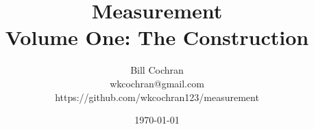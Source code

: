 \documentclass[12pt,oneside]{book}
\begin{document}
\title{Measurement\\[0.4em]\large Volume One: The Construction}
\author{Bill Cochran\\wkcochran@gmail.com\\https://github.com/wkcochran123/measurement}
\date{\today}
\maketitle

\frontmatter
\onehalfspacing
\tableofcontents



\mainmatter

















\backmatter
\printbibliography
\end{document}
